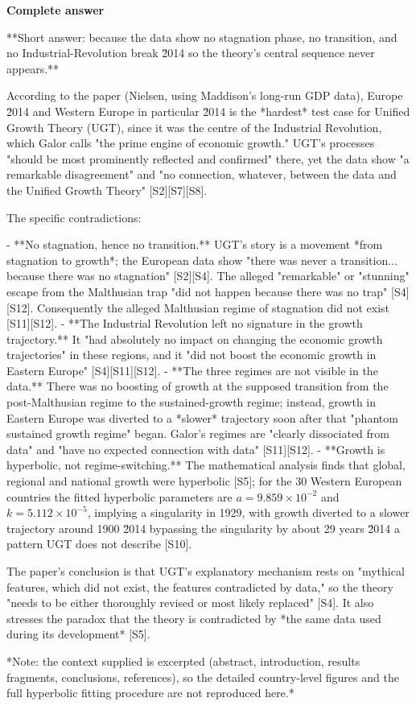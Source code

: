 \documentclass[10pt]{article}
\begin{document}
\textbf{Complete answer}
\begin{AnswerText}
**Short answer: because the data show no stagnation phase, no transition, and no Industrial-Revolution break \u2014 so the theory's central sequence never appears.**

According to the paper (Nielsen, using Maddison's long-run GDP data), Europe \u2014 and Western Europe in particular \u2014 is the *hardest* test case for Unified Growth Theory (UGT), since it was the centre of the Industrial Revolution, which Galor calls "the prime engine of economic growth." UGT's processes "should be most prominently reflected and confirmed" there, yet the data show "a remarkable disagreement" and "no connection, whatever, between the data and the Unified Growth Theory" [S2][S7][S8].

The specific contradictions:

- **No stagnation, hence no transition.** UGT's story is a movement *from stagnation to growth*; the European data show "there was never a transition... because there was no stagnation" [S2][S4]. The alleged "remarkable" or "stunning" escape from the Malthusian trap "did not happen because there was no trap" [S4][S12]. Consequently the alleged Malthusian regime of stagnation did not exist [S11][S12].
- **The Industrial Revolution left no signature in the growth trajectory.** It "had absolutely no impact on changing the economic growth trajectories" in these regions, and it "did not boost the economic growth in Eastern Europe" [S4][S11][S12].
- **The three regimes are not visible in the data.** There was no boosting of growth at the supposed transition from the post-Malthusian regime to the sustained-growth regime; instead, growth in Eastern Europe was diverted to a *slower* trajectory soon after that "phantom sustained growth regime" began. Galor's regimes are "clearly dissociated from data" and "have no expected connection with data" [S11][S12].
- **Growth is hyperbolic, not regime-switching.** The mathematical analysis finds that global, regional and national growth were hyperbolic [S5]; for the 30 Western European countries the fitted hyperbolic parameters are $a = 9.859\times10^{-2}$ and $k = 5.112\times10^{-5}$, implying a singularity in 1929, with growth diverted to a slower trajectory around 1900 \u2014 bypassing the singularity by about 29 years \u2014 a pattern UGT does not describe [S10].

The paper's conclusion is that UGT's explanatory mechanism rests on "mythical features, which did not exist, the features contradicted by data," so the theory "needs to be either thoroughly revised or most likely replaced" [S4]. It also stresses the paradox that the theory is contradicted by *the same data used during its development* [S5].

*Note: the context supplied is excerpted (abstract, introduction, results fragments, conclusions, references), so the detailed country-level figures and the full hyperbolic fitting procedure are not reproduced here.*
\end{AnswerText}
\end{document}
